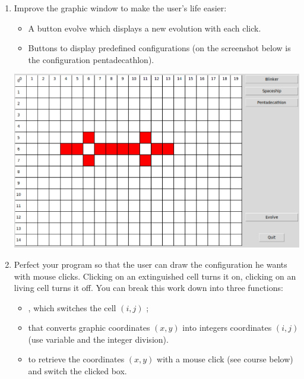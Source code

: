 \documentclass[11pt,class=report,crop=false]{standalone}
\begin{document}
 


\begin{activite}[Iterations]


\begin{enumerate}
  \item Improve the graphic window to make the user's life easier:
  \begin{itemize}
    \item A button \og{}evolve\fg{} which displays a new evolution with each click.
    \item Buttons to display predefined configurations (on the screenshot below is the configuration \og{}pentadecathlon\fg{}).
  \end{itemize}
  
\begin{center}
\includegraphics[scale=\myscale,scale=0.3]{screen-life-4a-en}
\end{center}  
  
  \item Perfect your program so that the user can draw the configuration he wants with mouse clicks. Clicking on an extinguished cell turns it on, clicking on an living cell turns it off. 
  You can break this work down into three functions:
  \begin{itemize}
    \item {}, which switches the cell $(i,j)$ ;
    \item {} that converts graphic coordinates $(x,y)$ into integers coordinates $(i,j)$ (use variable  and the integer division).
    \item {} to retrieve the coordinates $(x,y)$ with a mouse click (see course below) and switch the clicked box.
  \end{itemize}   
    

\end{enumerate}
\end{activite}
\end{document}
